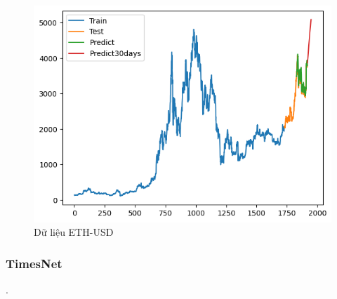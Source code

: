 \documentclass[conference]{IEEEtran}
\begin{document}
\begin{figure}[H]
\begin{minipage}{0.15\textwidth}
		\includegraphics[width=1\textwidth]{Figure/GRU_ETH_91.png}
	\end{minipage}
	\caption{Dữ liệu ETH-USD}
	\label{fig:1}
\end{figure}

\subsubsection{TimesNet}.
\end{document}
